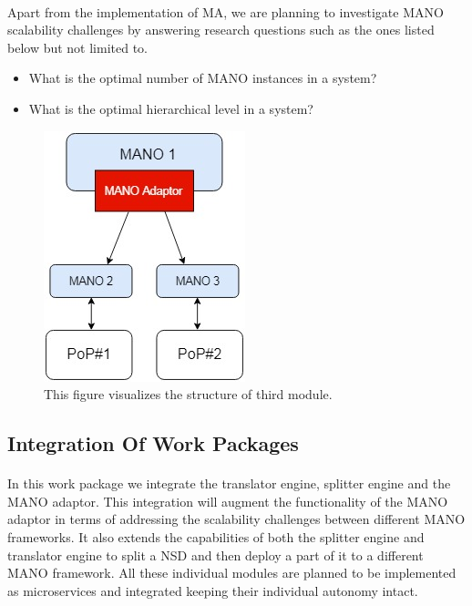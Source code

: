 \paragraph{}
Apart from the implementation of MA, we are planning to investigate MANO scalability challenges by answering research questions such as the ones listed below but not limited to.
\begin{itemize}
	\item What is the optimal number of MANO instances in a system?
	\item What is the optimal hierarchical level in a system?
\end{itemize}

\begin{figure}[h]
	\centering
	\includegraphics[width=0.29\linewidth]{figures/Structure2}
	\caption{This figure visualizes the structure of third module. }
	\label{fig:structure2}
\end{figure}

\subsection{Integration Of Work Packages}
\paragraph{}

In this work package we integrate the translator engine, splitter engine and the MANO adaptor. This integration will augment the functionality of the MANO adaptor in terms of addressing the scalability challenges between different MANO frameworks. It also extends the capabilities of both the splitter engine and translator engine to split a NSD and then deploy a part of it to a different MANO framework. All these individual modules are planned to be implemented as microservices and integrated keeping their individual autonomy intact. 

